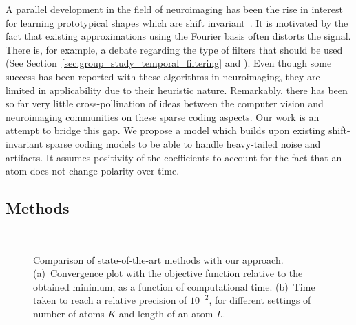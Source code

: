 A parallel development in the field of neuroimaging has been the rise in interest for learning prototypical shapes which are shift invariant~\citep{jost2006motif, barthelemy2013multivariate, brockmeier2016learning, hitziger2017adaptive}. It is motivated by the fact that existing approximations using the Fourier basis often distorts the signal. There is, for example, a debate regarding the type of filters that should be used (See Section~\ref{sec:group_study_temporal_filtering} and \cite{widmann2015digital,parks1987digital,ifeachor2002digital, gotz-etal:15}). 
Even though some success has been reported
with these algorithms in neuroimaging, they are limited in applicability due to their heuristic nature.
Remarkably, there has been so far very little cross-pollination of ideas between the computer vision and neuroimaging communities on these sparse coding aspects. 
Our work is an attempt to bridge this gap. 
We propose a model which builds upon existing shift-invariant sparse coding models to be able to handle heavy-tailed noise and artifacts. It assumes positivity of the coefficients to account for the fact that an atom does not change polarity over time. 

\subsection*{Methods}

\begin{figure}[htb]
    \centering
      \\
    \caption[]{Comparison of state-of-the-art methods with our approach. (a)~Convergence plot with the objective function relative to the obtained minimum, as a function of computational time. (b)~Time taken to reach a relative precision of $10^{-2}$, for different settings of number of atoms $K$ and length of an atom $L$.  }
    \label{fig:sommaire:convergence}
\end{figure}


